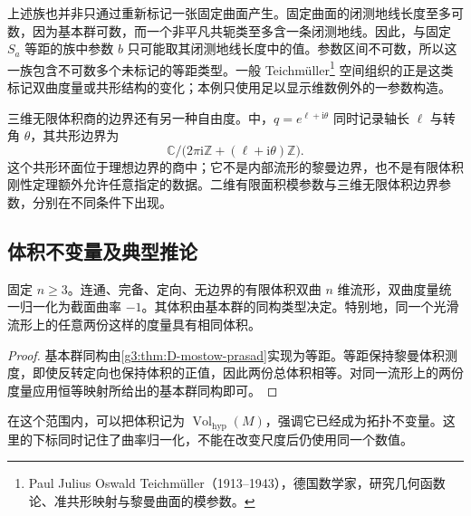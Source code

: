 \ProseParagraphBreak
上述族也并非只通过重新标记一张固定曲面产生。固定曲面的闭测地线长度至多可数，因为基本群可数，而一个非平凡共轭类至多含一条闭测地线。因此，与固定 \(S_a\) 等距的族中参数 \(b\) 只可能取其闭测地线长度中的值。参数区间不可数，所以这一族包含不可数多个未标记的等距类型。一般 Teichmüller\footnote{Paul Julius Oswald Teichmüller（1913--1943），德国数学家，研究几何函数论、准共形映射与黎曼曲面的模参数。} 空间组织的正是这类标记双曲度量或共形结构的变化；本例只使用足以显示维数例外的一参数构造。

\ProseParagraphBreak
三维无限体积商的边界还有另一种自由度。中，\(q=e^{\ell+\mathrm i\theta}\) 同时记录轴长 \(\ell\) 与转角 \(\theta\)，其共形边界为
\[
	\mathbb C/\bigl(2\pi\mathrm i\mathbb Z+
	(\ell+\mathrm i\theta)\mathbb Z\bigr).
\]
这个共形环面位于理想边界的商中；它不是内部流形的黎曼边界，也不是有限体积刚性定理额外允许任意指定的数据。二维有限面积模参数与三维无限体积边界参数，分别在不同条件下出现。

\subsection{体积不变量及典型推论}
\label{g3:subsec:D05:05}

\begin{corollary}\label{g3:cor:D-hyperbolic-volume}
	固定 \(n\ge3\)。连通、完备、定向、无边界的有限体积双曲 \(n\) 维流形，双曲度量统一归一化为截面曲率 \(-1\)。其体积由基本群的同构类型决定。特别地，同一个光滑流形上的任意两份这样的度量具有相同体积。
\end{corollary}
\begin{proof}
	基本群同构由\cref{g3:thm:D-mostow-prasad}实现为等距。等距保持黎曼体积测度，即使反转定向也保持体积的正值，因此两份总体积相等。对同一流形上的两份度量应用恒等映射所给出的基本群同构即可。
\end{proof}

在这个范围内，可以把体积记为 \(\operatorname{Vol}_{\mathrm{hyp}}(M)\)，强调它已经成为拓扑不变量。这里的下标同时记住了曲率归一化，不能在改变尺度后仍使用同一个数值。

